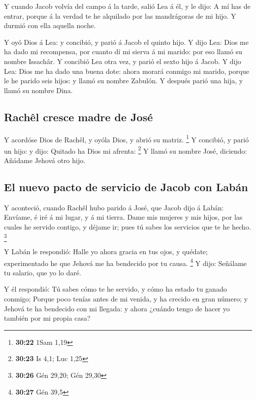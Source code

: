  Y cuando Jacob volvía del campo á la tarde, salió Lea á
él, y le dijo: A mí has de entrar, porque á la verdad te he alquilado
por las mandrágoras de mi hijo. Y durmió con ella aquella noche.

 Y oyó Dios á Lea: y concibió, y parió á Jacob el quinto
hijo.  Y dijo Lea: Dios me ha dado mi recompensa, por
cuanto dí mi sierva á mi marido: por eso llamó su nombre Issachâr.
 Y concibió Lea otra vez, y parió el sexto hijo á Jacob.
 Y dijo Lea: Dios me ha dado una buena dote: ahora morará
conmigo mi marido, porque le he parido seis hijos: y llamó su nombre
Zabulón.  Y después parió una hija, y llamó su nombre Dina.

\hypertarget{rachuxeal-cresce-madre-de-josuxe9}{%
\subsection{Rachêl cresce madre de
José}\label{rachuxeal-cresce-madre-de-josuxe9}}

 Y acordóse Dios de Rachêl, y oyóla Dios, y abrió su
matriz. \footnote{\textbf{30:22} 1Sam 1,19}  Y concibió, y
parió un hijo: y dijo: Quitado ha Dios mi afrenta: \footnote{\textbf{30:23}
  Is 4,1; Luc 1,25}  Y llamó su nombre José, diciendo:
Añádame Jehová otro hijo.

\hypertarget{el-nuevo-pacto-de-servicio-de-jacob-con-labuxe1n}{%
\subsection{El nuevo pacto de servicio de Jacob con
Labán}\label{el-nuevo-pacto-de-servicio-de-jacob-con-labuxe1n}}

 Y aconteció, cuando Rachêl hubo parido á José, que Jacob
dijo á Labán: Envíame, é iré á mi lugar, y á mi tierra. 
Dame mis mujeres y mis hijos, por las cuales he servido contigo, y
déjame ir; pues tú sabes los servicios que te he hecho. \footnote{\textbf{30:26}
  Gén 29,20; Gén 29,30}

 Y Labán le respondió: Halle yo ahora gracia en tus ojos, y
quédate; experimentado he que Jehová me ha bendecido por tu causa.
\footnote{\textbf{30:27} Gén 39,5}  Y dijo: Señálame tu
salario, que yo lo daré.

 Y él respondió: Tú sabes cómo te he servido, y cómo ha
estado tu ganado conmigo;  Porque poco tenías antes de mi
venida, y ha crecido en gran número; y Jehová te ha bendecido con mi
llegada: y ahora ¿cuándo tengo de hacer yo también por mi propia casa?

